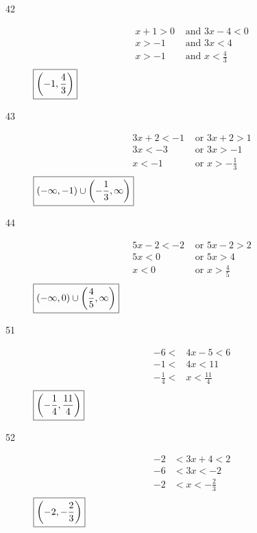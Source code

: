 \documentclass[letterpaper, landscape]{exam}
\begin{document}
\begin{description}
      \item[42]
        \begin{align*}
          x + 1 > 0 & \text{ and } 3x - 4 < 0 \\
          x > -1    & \text{ and } 3x < 4 \\
          x > -1    & \text{ and } x < \frac{4}{3} \\
        \end{align*}
        $\boxed{ \intoo{ -1, \frac{4}{3} } }$

      \item[43]
        \begin{align*}
          3x + 2 < -1 & \text{ or } 3x + 2 > 1 \\
          3x < -3     & \text{ or } 3x > -1 \\
          x < -1      & \text{ or } x > - \frac{1}{3} \\
        \end{align*}
        $\boxed{ \intoo{ -\infty, -1 } \cup \intoo{ -\frac{1}{3}, \infty } }$

      \item[44]
        \begin{align*}
          5x - 2 < -2 & \text{ or } 5x - 2 > 2 \\
          5x < 0      & \text{ or } 5x > 4 \\
          x < 0       & \text{ or } x > \frac{4}{5} \\
        \end{align*}
        $\boxed{ \intoo{ -\infty, 0 } \cup \intoo{ \frac{4}{5}, \infty } }$

      \item[51]
        \begin{align*}
          -6 <            & 4x - 5 < 6 \\
          -1 <            & 4x < 11 \\
          - \frac{1}{4} < & x < \frac{11}{4} \\
        \end{align*}
        $\boxed{ \intoo{ - \frac{1}{4}, \frac{11}{4} } }$

      \item[52]
        \begin{align*}
          -2 & < 3x + 4 < 2 \\
          -6 & < 3x < -2 \\
          -2 & < x < -\frac{2}{3} \\
        \end{align*}
        $\boxed{ \intoo{ -2, -\frac{2}{3} } }$


\end{description}
\end{document}
